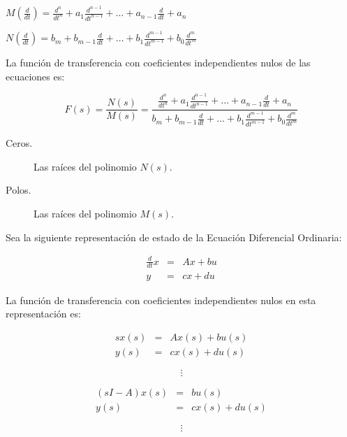 \begin{math}
M \left( \frac{d}{dt} \right) = \frac{d^n}{dt^n} + a_1 \frac{d^{n-1}}{dt^{n-1}} + \dots + a_{n-1} \frac{d}{dt} + a_n
\end{math}

\begin{math}
N \left( \frac{d}{dt} \right) = b_m + b_{m-1} \frac{d}{dt} + \dots + b_1 \frac{d^{m-1}}{dt^{m-1}} + b_0 \frac{d^m}{dt^m}
\end{math}

La función de transferencia con coeficientes independientes nulos de las ecuaciones es:

\begin{equation}
F(s) = \frac{N(s)}{M(s)} = \frac{\frac{d^n}{dt^n} + a_1 \frac{d^{n-1}}{dt^{n-1}} + \dots + a_{n-1} \frac{d}{dt} + a_n}{b_m + b_{m-1} \frac{d}{dt} + \dots + b_1 \frac{d^{m-1}}{dt^{m-1}} + b_0 \frac{d^m}{dt^m}}
\end{equation}

\begin{description}
\item [Ceros.] Las raíces del polinomio $N(s)$.
\item [Polos.] Las raíces del polinomio $M(s)$.
\end{description}

Sea la siguiente representación de estado de la Ecuación Diferencial Ordinaria:

\begin{eqnarray}
\frac{d}{dt} x & = & A x + b u \nonumber \\
y & = & c x + d u \nonumber
\end{eqnarray}

La función de transferencia con coeficientes independientes nulos en esta representación es:

\begin{eqnarray}
s x(s) & = & A x(s) + b u(s) \nonumber \\
y(s) & = & c x(s) + d u(s) \nonumber
\end{eqnarray}

\begin{equation}
\vdots \nonumber
\end{equation}

\begin{eqnarray}
(s I - A) x(s) & = & b u(s) \nonumber \\
y(s) & = & c x(s) + d u(s) \nonumber
\end{eqnarray}

\begin{equation}
\vdots \nonumber
\end{equation}

